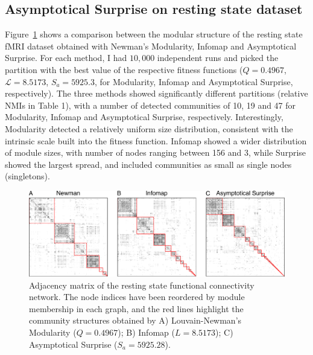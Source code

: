 \subsection{Asymptotical Surprise on resting state dataset}
Figure~\ref{fig:partitioncomparison} shows a comparison between the modular structure of the resting state fMRI dataset obtained with Newman's Modularity, Infomap and Asymptotical Surprise.
For each method, I had $10,000$ independent runs and picked the partition with the best value of the respective fitness functions ($Q=0.4967$, $\mathcal{L}=8.5173$, $S_a=5925.3$, for Modularity, Infomap and Asymptotical Surprise, respectively).
The three methods showed significantly different partitions (relative NMIs in Table 1), with a number of detected communities of 10, 19 and 47 for Modularity, Infomap and Asymptotical Surprise, respectively.
Interestingly, Modularity detected a relatively uniform size distribution, consistent with the intrinsic scale built into the fitness function.
Infomap showed a wider distribution of module sizes, with number of nodes ranging between 156 and 3, while Surprise showed the largest spread, and included communities as small as single nodes (singletons).
\begin{figure}[htb!]
\includegraphics[width=\textwidth]{images/pacopaperfigure6.pdf}
\caption{Adjacency matrix of the resting state functional connectivity network. The node indices have been reordered by module membership in each graph, and the red lines highlight the community structures obtained by A) Louvain-Newman's Modularity ($Q=0.4967$); B) Infomap ($L=8.5173$); C) Asymptotical Surprise ($S_a=5925.28$).}
\label{fig:partitioncomparison}
\end{figure}


